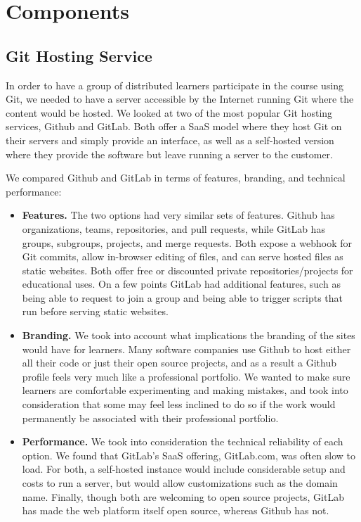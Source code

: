 \documentclass[12pt,twoside]{mitthesis}
\begin{document}
\section{Components}

\subsection{Git Hosting Service}

In order to have a group of distributed learners participate in the course using Git, we needed to have a server accessible by the Internet running Git where the content would be hosted. We looked at two of the most popular Git hosting services, Github and GitLab. Both offer a SaaS model where they host Git on their servers and simply provide an interface, as well as a self-hosted version where they provide the software but leave running a server to the customer.

We compared Github and GitLab in terms of features, branding, and technical performance:

\begin{itemize}
\item \textbf{Features.} The two options had very similar sets of features. Github has organizations, teams, repositories, and pull requests, while GitLab has groups, subgroups, projects, and merge requests. Both expose a webhook for Git commits, allow in-browser editing of files, and can serve hosted files as static websites. Both offer free or discounted private repositories/projects for educational uses. On a few points GitLab had additional features, such as being able to request to join a group and being able to trigger scripts that run before serving static websites.
\item \textbf{Branding.} We took into account what implications the branding of the sites would have for learners. Many software companies use Github to host either all their code or just their open source projects, and as a result a Github profile feels very much like a professional portfolio. We wanted to make sure learners are comfortable experimenting and making mistakes, and took into consideration that some may feel less inclined to do so if the work would permanently be associated with their professional portfolio. 
\item \textbf{Performance.} We took into consideration the technical reliability of each option. We found that GitLab's SaaS offering, GitLab.com, was often slow to load. For both, a self-hosted instance would include considerable setup and costs to run a server, but would allow customizations such as the domain name. Finally, though both are welcoming to open source projects, GitLab has made the web platform itself open source, whereas Github has not.
\end{itemize}
\end{document}
